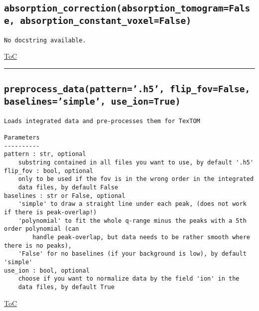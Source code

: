\documentclass{article}
\begin{document}
\subsection*{\texttt{absorption\_correction(absorption\_tomogram=False, absorption\_constant\_voxel=False)}}
\label{fun:absorptioncorrection}

\begin{lstlisting}[language=docstring]
No docstring available.
\end{lstlisting}

\begin{flushright}

\hyperref[toc]{ToC}

\end{flushright}



\vspace{5mm}

\hrule

\subsection*{\texttt{preprocess\_data(pattern='.h5', flip\_fov=False, baselines='simple', use\_ion=True)}}
\label{fun:preprocessdata}

\begin{lstlisting}[language=docstring]
Loads integrated data and pre-processes them for TexTOM

Parameters
----------
pattern : str, optional
    substring contained in all files you want to use, by default '.h5'
flip_fov : bool, optional
    only to be used if the fov is in the wrong order in the integrated
    data files, by default False
baselines : str or False, optional
    'simple' to draw a straight line under each peak, (does not work if there is peak-overlap!)
    'polynomial' to fit the whole q-range minus the peaks with a 5th order polynomial (can
        handle peak-overlap, but data needs to be rather smooth where there is no peaks), 
    'False' for no baselines (if your background is low), by default 'simple'
use_ion : bool, optional
    choose if you want to normalize data by the field 'ion' in the 
    data files, by default True
\end{lstlisting}

\begin{flushright}

\hyperref[toc]{ToC}

\end{flushright}
\end{document}
